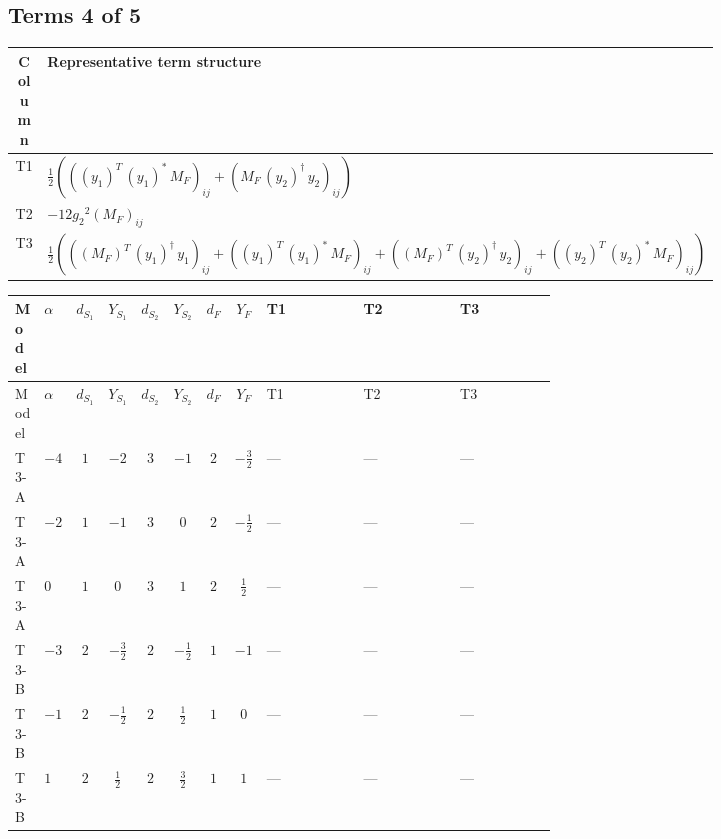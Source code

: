 \documentclass[8pt]{article}
\begin{document}
\begin{landscape}
\subsection*{Terms 4 of 5}
\begin{center}
\begin{tabular}{@{}c >{\raggedright\arraybackslash}p{0.82\linewidth}@{}}
\toprule
Column & Representative term structure \\
\midrule
T1 & \(\displaystyle \frac{1}{2} (\left(\left({y_1}\right)^{T}\,\left({y_1}\right)^{*}\,{M_F}\right)_{ij}+\left({M_F}\,\left({y_2}\right)^{\dagger}\,{y_2}\right)_{ij})\) \\
\midrule
T2 & \(\displaystyle -12 {g_2}^2 \left({M_F}\right)_{ij}\) \\
\midrule
T3 & \(\displaystyle \frac{1}{2} (\left(\left({M_F}\right)^{T}\,\left({y_1}\right)^{\dagger}\,{y_1}\right)_{ij}+\left(\left({y_1}\right)^{T}\,\left({y_1}\right)^{*}\,{M_F}\right)_{ij}+\left(\left({M_F}\right)^{T}\,\left({y_2}\right)^{\dagger}\,{y_2}\right)_{ij}+\left(\left({y_2}\right)^{T}\,\left({y_2}\right)^{*}\,{M_F}\right)_{ij})\) \\
\midrule
\bottomrule
\end{tabular}
\end{center}
\smallskip
\tiny
\begin{longtable}{@{}llcccccc >{\raggedright\arraybackslash}p{0.21\linewidth} >{\raggedright\arraybackslash}p{0.21\linewidth} >{\raggedright\arraybackslash}p{0.21\linewidth}@{}}
\toprule
Model & $\alpha$ & $d_{S_1}$ & $Y_{S_1}$ & $d_{S_2}$ & $Y_{S_2}$ & $d_F$ & $Y_F$ & T1 & T2 & T3 \\
\midrule
\endfirsthead
\toprule
Model & $\alpha$ & $d_{S_1}$ & $Y_{S_1}$ & $d_{S_2}$ & $Y_{S_2}$ & $d_F$ & $Y_F$ & T1 & T2 & T3 \\
\midrule
\endhead
T3-A & $-4$ & $1$ & $-2$ & $3$ & $-1$ & $2$ & $-\frac{3}{2}$ & --- & --- & --- \\
\midrule
T3-A & $-2$ & $1$ & $-1$ & $3$ & $0$ & $2$ & $-\frac{1}{2}$ & --- & --- & --- \\
\midrule
T3-A & $0$ & $1$ & $0$ & $3$ & $1$ & $2$ & $\frac{1}{2}$ & --- & --- & --- \\
\midrule
T3-B & $-3$ & $2$ & $-\frac{3}{2}$ & $2$ & $-\frac{1}{2}$ & $1$ & $-1$ & --- & --- & --- \\
\midrule
T3-B & $-1$ & $2$ & $-\frac{1}{2}$ & $2$ & $\frac{1}{2}$ & $1$ & $0$ & --- & --- & --- \\
\midrule
T3-B & $1$ & $2$ & $\frac{1}{2}$ & $2$ & $\frac{3}{2}$ & $1$ & $1$ & --- & --- & --- \\

\end{longtable}
\end{landscape}
\end{document}
